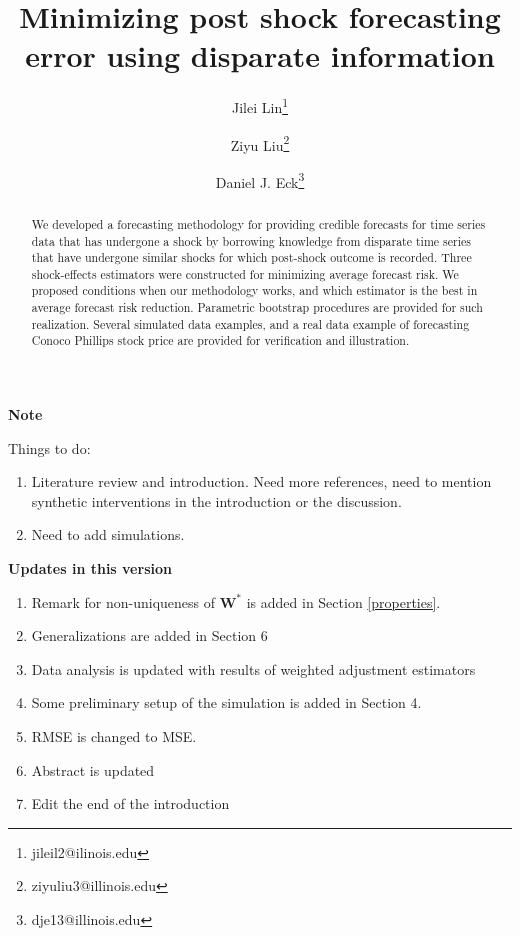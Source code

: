 \documentclass[11pt]{article}
\title{Minimizing post shock forecasting error using disparate information}
\author{Jilei Lin\thanks{jileil2@ilinois.edu}}
\author{Ziyu Liu\thanks{ziyuliu3@illinois.edu}}
\author{Daniel J. Eck\thanks{dje13@illinois.edu}}
\affil{Department of Statistics, University of Illinois at Urbana-Champaign}
\theoremstyle{definition}
\begin{document}
\begin{center}
  \textbf{Note}
\end{center}


Things to do:
\begin{enumerate}
  \item Literature review and introduction. Need more references, need to mention synthetic interventions in the introduction or the discussion.
  \item Need to add simulations. 
\end{enumerate}


\begin{center}
  \textbf{Updates in this version}
\end{center}

\begin{enumerate}
  \item Remark for non-uniqueness of $\mathbf{W}^*$ is added in Section \ref{properties}.
  \item Generalizations are added in Section 6
  \item Data analysis is updated with results of weighted adjustment estimators
  \item Some preliminary setup of the simulation is added in Section 4.
  \item RMSE is changed to MSE.
  \item Abstract is updated
  \item Edit the end of the introduction
\end{enumerate}




\newpage 

\maketitle
\begin{abstract}
    We developed a forecasting methodology for providing credible forecasts for time series data that has undergone a shock  by borrowing knowledge from disparate 
    time series that have undergone similar shocks for which post-shock 
    outcome is recorded. Three shock-effects estimators were constructed for minimizing average forecast risk. We proposed conditions when our methodology works, and which estimator is the best in average forecast risk reduction. Parametric bootstrap procedures are provided for such realization. Several simulated data examples, and a real data example of forecasting Conoco Phillips stock price are provided for verification and illustration.
\end{abstract}
\end{document}
